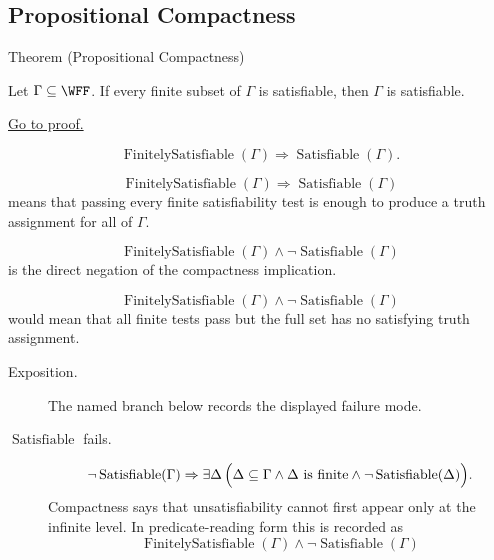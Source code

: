 \subsection*{Propositional Compactness}

\begin{theorembox}{Theorem (Propositional Compactness)}
\begin{theorem}
\label{thm:propositional-compactness}
Let \(\Gamma\subseteq\WFF\). If every finite subset of \(\Gamma\) is
satisfiable, then \(\Gamma\) is satisfiable.

\medskip
\noindent\hyperref[prf:propositional-compactness]{Go to proof.}
\end{theorem}
\end{theorembox}

\begin{remark*}
\[
\operatorname{FinitelySatisfiable}(\Gamma)
\Rightarrow
\operatorname{Satisfiable}(\Gamma).
\]
\end{remark*}

\begin{remark*}
\[
\operatorname{FinitelySatisfiable}(\Gamma)
\Rightarrow
\operatorname{Satisfiable}(\Gamma)
\]
means that passing every finite satisfiability test is enough to produce a
truth assignment for all of \(\Gamma\).
\end{remark*}

\begin{remark*}
\[
\operatorname{FinitelySatisfiable}(\Gamma)\land
\neg\operatorname{Satisfiable}(\Gamma)
\]
is the direct negation of the compactness implication.
\end{remark*}

\begin{remark*}
\[
\operatorname{FinitelySatisfiable}(\Gamma)\land
\neg\operatorname{Satisfiable}(\Gamma)
\]
would mean that all finite tests pass but the full set has no satisfying truth
assignment.
\end{remark*}

\begin{remark*}
\begin{description}
  \item[Exposition.] The named branch below records the displayed failure mode.
\item[\(\operatorname{Satisfiable}\) fails.] \[
\neg\operatorname{Satisfiable}(\Gamma)
\Rightarrow
\exists\Delta\,\Bigl(\Delta\subseteq\Gamma\land \Delta\text{ is finite}\land
\neg\operatorname{Satisfiable}(\Delta)\Bigr).
\]
Compactness says that unsatisfiability cannot first appear only at the infinite
level.
  In predicate-reading form this is recorded as
  \[
  \operatorname{FinitelySatisfiable}(\Gamma)\land
  \neg\operatorname{Satisfiable}(\Gamma)
  \]
\end{description}
\end{remark*}

